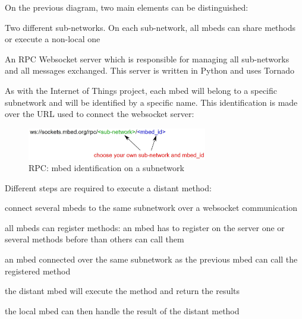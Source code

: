 \documentclass[pdftex,10pt,a4paper]{report}
\newenvironment{packed_item}{
\begin{itemize}
  \setlength{\itemsep}{1pt}
  \setlength{\parskip}{0pt}
  \setlength{\parsep}{0pt}
}{\end{itemize}}
\begin{document}
On the previous diagram, two main elements can be distinguished:
\begin{packed_item}
	\item Two different sub-networks. On each sub-network, all mbeds can share methods or execute a non-local one
	\item An RPC Websocket server which is responsible for managing all sub-networks and all messages exchanged. This server is written in Python and uses Tornado
\end{packed_item}


As with the Internet of Things project, each mbed will belong to a specific subnetwork and will be identified by a specific name. This identification is made over the URL used to connect the websocket server:

\begin{figure}[h!]
		\centering
		\includegraphics[width=0.7\textwidth]{./rpc_ws.jpg}
		\caption{RPC: mbed identification on a subnetwork}
		\label{RPC: mbed identification on a subnetwork}
\end{figure}

Different steps are required to execute a distant method:
\begin{packed_item}
	\item connect several mbeds to the same subnetwork over a websocket communication
	\item all mbeds can register methods: an mbed has to register on the server one or several methods before than others can call them
	\item an mbed connected over the same subnetwork as the previous mbed can call the registered method
	\item the distant mbed will execute the method and return the results
	\item the local mbed can then handle the result of the distant method
\end{packed_item}
\end{document}
